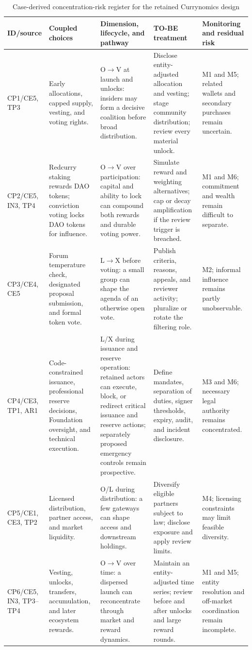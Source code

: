 \documentclass[referee,sn-basic]{sn-jnl}
\begin{document}
\begin{table}[p]
\caption{Case-derived concentration-risk register for the retained Currynomics design}
\label{tab:currynomics-risk-register}
\centering
\scriptsize
\begin{tabularx}{\linewidth}{@{}
>{\raggedright\arraybackslash}p{.12\linewidth}
>{\raggedright\arraybackslash}p{.13\linewidth}
>{\raggedright\arraybackslash}X
>{\raggedright\arraybackslash}X
>{\raggedright\arraybackslash}X@{}}
\toprule
ID/source & Coupled choices & Dimension, lifecycle, and pathway & TO-BE treatment &
Monitoring and residual risk \\
\midrule
CP1/CE5, TP3 & Early allocations, capped supply, vesting, and voting
rights. & O$\rightarrow$V at launch and unlocks: insiders may form a decisive
coalition before broad distribution. & Disclose entity-adjusted allocation and
vesting; stage community distribution; review every material unlock. & M1 and
M5; related wallets and secondary purchases remain uncertain. \\
CP2/CE5, IN3, TP4 & Redcurry staking rewards DAO tokens; conviction voting locks DAO
tokens for influence. & O$\rightarrow$V over participation: capital and ability
to lock can compound both rewards and durable voting power. & Simulate reward
and weighting alternatives; cap or decay amplification if the review trigger
is breached. & M1 and M6; commitment and wealth remain difficult to separate. \\
CP3/CE4, CE5 & Forum temperature check, designated proposal submission, and formal
token vote. & L$\rightarrow$X before voting: a small group can shape the agenda
of an otherwise open vote. & Publish criteria, reasons, appeals, and reviewer
activity; pluralize or rotate the filtering role. & M2; informal influence
remains partly unobservable. \\
CP4/CE3, TP1, AR1 & Code-constrained issuance, professional reserve decisions, Foundation
oversight, and technical execution. & L/X during issuance and reserve operation:
retained actors can execute, block, or redirect critical issuance and reserve
actions; separately proposed emergency controls remain prospective. & Define
mandates, separation of duties, signer thresholds, expiry, audit, and incident
disclosure. & M3 and M6; necessary legal authority remains concentrated. \\
CP5/CE1, CE3, TP2 & Licensed distribution, partner access, and market liquidity. &
O/L during distribution: a few gateways can shape access and downstream
holdings. & Diversify eligible partners subject to law; disclose exposure and
apply review limits. & M4; licensing constraints may limit feasible diversity.
\\
CP6/CE5, IN3, TP3--TP4 & Vesting, unlocks, transfers, accumulation, and later ecosystem
rewards. & O$\rightarrow$V over time: a dispersed launch can reconcentrate
through market and reward dynamics. & Maintain an entity-adjusted time series;
review before and after unlocks and large reward rounds. & M1 and M5; entity
resolution and off-market coordination remain incomplete. \\
\bottomrule
\end{tabularx}
\end{table}
\end{document}
